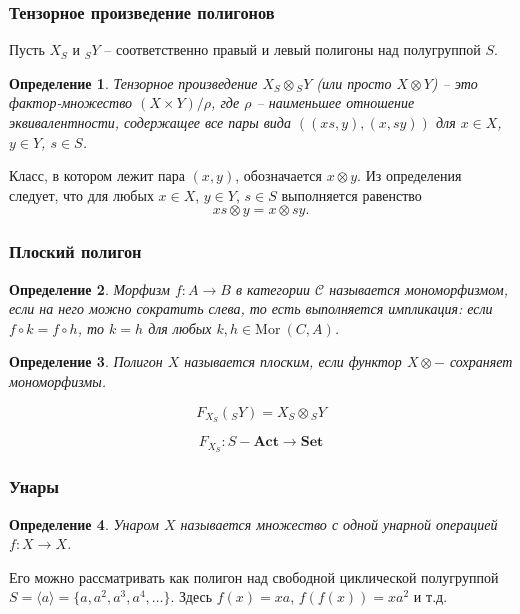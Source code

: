 \documentclass[11pt, notheorems]{beamer}
\newtheorem{definition}{Определение}
\begin{document}
\begin{frame}
	\frametitle{Тензорное произведение полигонов}

	Пусть $X_S$ и ${}_{S}Y$ -- соответственно правый и левый полигоны над полугруппой $S$.

	\begin{definition}
		\textit{Тензорное произведение} $X_S \otimes {}_{S}Y$ (или просто $X \otimes Y$) -- это фактор-множество $(X \times Y) / \rho$, где $\rho$ -- наименьшее отношение эквивалентности, содержащее все пары вида $((xs, y),(x, sy))$ для $x \in X$, $y \in Y$, $s \in S$.
	\end{definition}

	Класс, в котором лежит пара $(x, y)$, обозначается $x \otimes y$.
	Из определения следует, что для любых $x \in X$, $y \in Y$, $s \in S$ выполняется равенство $$ xs \otimes y = x \otimes sy. $$

\end{frame}

\begin{frame}
	\frametitle{Плоский полигон}

	\begin{definition}
		Морфизм $f: A \rightarrow B$ в категории $\mathcal{C}$ называется \textit{мономорфизмом}, если на него можно сократить слева, то есть выполняется импликация:
		если $f \circ k = f \circ h$, то $k = h$ для любых $k, h \in \mathrm{Mor} \ (C, A)$.
	\end{definition}

	\begin{definition}
		Полигон $X$ называется плоским, если функтор $X \otimes - $ сохраняет мономорфизмы.
	\end{definition}

	$$ F_{X_S} ({}_{S}Y) = X_S \otimes {}_{S}Y $$

	$$ F_{X_S}: S-\textbf{Act} \rightarrow \textbf{Set}$$
\end{frame}

\begin{frame}
	\frametitle{Унары}

	\begin{definition}
		Унаром $X$ называется множество с одной унарной операцией $f: X \rightarrow X$.
	\end{definition}

	Его можно рассматривать как полигон над свободной циклической полугруппой $S = \langle a \rangle = \{ a, a^2, a^3, a^4, \ldots \}$.
	Здесь $f(x) = xa$, $f(f(x)) = x a^2$ и т.д.
\end{frame}
\end{document}
